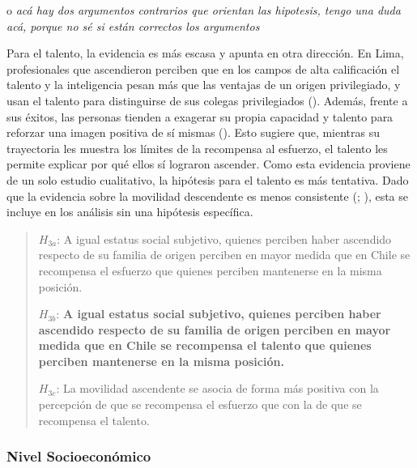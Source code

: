 \documentclass[
  spanish,
  a4paper,
  oneside]{scrbook}
\begin{document}
o \emph{acá hay dos argumentos contrarios que orientan las hipotesis,
tengo una duda acá, porque no sé si están correctos los argumentos}

Para el talento, la evidencia es más escasa y apunta en otra dirección.
En Lima, profesionales que ascendieron perciben que en los campos de
alta calificación el talento y la inteligencia pesan más que las
ventajas de un origen privilegiado, y usan el talento para distinguirse
de sus colegas privilegiados
(). Además,
frente a sus éxitos, las personas tienden a exagerar su propia capacidad
y talento para reforzar una imagen positiva de sí mismas
(). Esto sugiere que, mientras su trayectoria les
muestra los límites de la recompensa al esfuerzo, el talento les permite
explicar por qué ellos sí lograron ascender. Como esta evidencia
proviene de un solo estudio cualitativo, la hipótesis para el talento es
más tentativa. Dado que la evidencia sobre la movilidad descendente es
menos consistente (;
), esta se incluye en los análisis sin una
hipótesis específica.

\begin{quote}
\(H_{3a}\): A igual estatus social subjetivo, quienes perciben haber
ascendido respecto de su familia de origen perciben en mayor medida que
en Chile se recompensa el esfuerzo que quienes perciben mantenerse en la
misma posición.

\(H_{3b}\): \textbf{A igual estatus social subjetivo, quienes perciben
haber ascendido respecto de su familia de origen perciben en mayor
medida que en Chile se recompensa el talento que quienes perciben
mantenerse en la misma posición.}

\(H_{3c}\): La movilidad ascendente se asocia de forma más positiva con
la percepción de que se recompensa el esfuerzo que con la de que se
recompensa el talento.
\end{quote}

\subsubsection{Nivel Socioeconómico}\label{nivel-socioeconuxf3mico}
\end{document}
